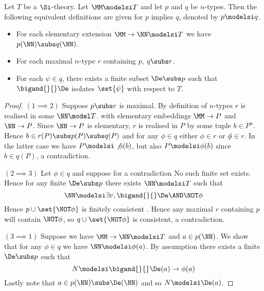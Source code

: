 



\begin{dfn}
    Let $T$ be a $\Si$-theory. 
    Let $\MM \modelsi T$ and let $p$ and $q$ be $n$-types.
    Then the following equivalent definitions are given for $p$ implies $q$,
    denoted by $p \modelsi q$.
    \begin{itemize}
        \item For each elementary extension $\MM \to \NN \modelsi T$ 
        we have $p(\NN) \subs q(\NN)$.
        \item For each maximal $n$-type $r$ containing $p$, $q \subs r$.
        \item For each $\psi \in q$, 
        there exists a finite subset $\De \subs p$ such that 
        $\bigand{}{} \De$ isolates $\set{\psi}$ with respect to $T$.
    \end{itemize}
\end{dfn}
\begin{proof}
    $(1 \implies 2)$ Suppose $p \subs r$ is maximal. 
    By definition of $n$-types $r$ is realised in some $\NN \model T$.
    with elementary embeddings $\MM \to P$ and $\NN \to P$.
    Since $\NN \to P$ is elementary, 
    $r$ is realised in $P$ by some tuple $b \in P^n$.
    Hence $b \in r(P) \subs p(P) \subs q(P)$ and for any $\phi \in q$
    either $\phi \in r$ or $\not \phi \in r$. 
    In the latter case we have $P \modelsi \not \phi(b)$,
    but also $P \modelsi \phi(b)$ since $b \in q(P)$, a contradiction.
    
    $(2 \implies 3)$ Let $\phi \in q$ and suppose for a contradiction
    No such finite set exists. 
    Hence for any finite $\De \subs p$ there exists $\NN \modelsi T$
    such that
    \[
        \NN \modelsi \exists v, \bigand{}{} \De \AND \NOT \phi
    \]
    Hence $p \cup \set{\NOT \phi}$ is finitely consistent 
    .
    Hence any maximal $r$ containing $p$ will contain $\NOT \phi$,
    so $q \cup \set{\NOT \phi}$ is consistent, a contradiction.
    
    $(3 \implies 1)$ Suppose we have $\MM \to \NN \modelsi T$ and
    $a \in p(\NN)$.
    We show that for any $\phi \in q$ we have $\NN \modelsi \phi(a)$.
    By assumption there exists a finite $\De \subs p$ such that 
    \[
        N \modelsi \bigand{}{} \De(a) \to \phi(a)
    \]
    Lastly note that $a \in p(\NN) \subs \De(\NN)$ and so $N \modelsi \De(a)$.
\end{proof}